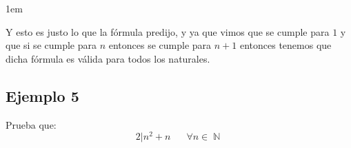 \documentclass[12pt, fleqn]{report}                             %
\newenvironment{SmallIndentation}[1][0.75em]                    %
        {\begin{adjustwidth}{#1}{}\begin{footnotesize}}             %
        {\end{footnotesize}\end{adjustwidth}}                       %
\DeclareMathOperator \Space     {\quad}                         %
\theoremstyle{break}                                            %
\DeclareMathOperator \Naturals     {\mathbb{N}}                 %
\begin{document}
\begin{SmallIndentation}[1em]
\begin{itemize}
                        Y esto es justo lo que la fórmula predijo, y ya que vimos que se cumple
                        para $1$ y que si se cumple para $n$ entonces se cumple para $n+1$ entonces
                        tenemos que dicha fórmula es válida para todos los naturales.
                        
                    \end{itemize}

                    

                \end{SmallIndentation}


            \clearpage
            \subsection*{Ejemplo 5}

                Prueba que:
                \begin{equation*}
                    2 | n^2 + n 
                    \Space \forall n \in \Naturals 
                \end{equation*}
\end{document}
